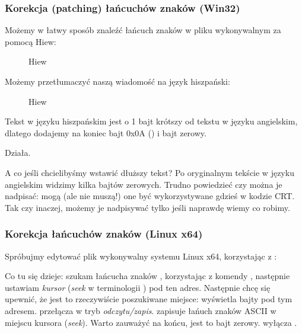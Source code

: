 \subsubsection{Korekcja (patching) łańcuchów znaków (Win32)}

Możemy w łatwy sposób znaleźć łańcuch znaków   w pliku wykonywalnym za pomocą Hiew:

\begin{figure}[H]
\centering
{}
\caption{Hiew}
\label{}
\end{figure}

Możemy przetłumaczyć naszą wiadomość na język hiszpański:

\begin{figure}[H]
\centering
{}
\caption{Hiew}
\label{}
\end{figure}

Tekst w języku hiszpańskim jest o 1 bajt krótszy od tekstu w języku angielskim, dlatego dodajemy na koniec bajt 0x0A () i bajt zerowy.

Działa.

A co jeśli chcielibyśmy wstawić dłuższy tekst?
Po oryginalnym tekście w języku angielskim widzimy kilka bajtów zerowych.
Trudno powiedzieć czy można je nadpisać: mogą (ale nie muszą!) one być wykorzystywane gdzieś w kodzie \ac{CRT}.
Tak czy inaczej, możemy je nadpisywać tylko jeśli naprawdę wiemy co robimy.

\subsubsection{Korekcja łańcuchów znaków (Linux x64)}

\myindex{\radare}
Spróbujmy edytować plik wykonywalny systemu Linux x64, korzystając z \radare{}:



Co tu  się dzieje: szukam łańcucha znaków , korzystając z komendy \TT{/},
następnie ustawiam \emph{kursor} (\emph{seek} w terminologii \radare{}) pod ten adres.
Następnie chcę się upewnić, że jest to rzeczywiście poszukiwane miejsce:  wyświetla bajty pod tym adresem.
 przełącza \radare{} w tryb \emph{odczytu/zapis}.
 zapisuje łańuch znaków ASCII w miejscu kursora (\emph{seek}).
Warto zauważyć  na końcu, jest to bajt zerowy.
 wyłącza \radare.


